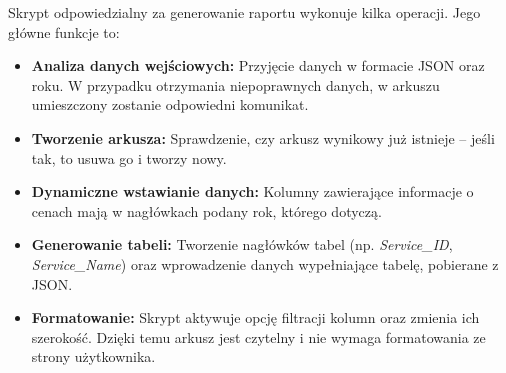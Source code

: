 Skrypt odpowiedzialny za generowanie raportu wykonuje kilka operacji. Jego główne funkcje to:
\begin{itemize}
    \item \textbf{Analiza danych wejściowych:} Przyjęcie danych w formacie JSON oraz roku. W przypadku otrzymania niepoprawnych danych, w arkuszu umieszczony zostanie odpowiedni komunikat.
    \item \textbf{Tworzenie arkusza:} Sprawdzenie, czy arkusz wynikowy już istnieje -- jeśli tak, to usuwa go i tworzy nowy.
    \item \textbf{Dynamiczne wstawianie danych:} Kolumny zawierające informacje o cenach mają w nagłówkach podany rok, którego dotyczą.
    \item \textbf{Generowanie tabeli:} Tworzenie nagłówków tabel (np. \emph{Service\_ID}, \emph{Service\_Name}) oraz wprowadzenie danych wypełniające tabelę, pobierane z JSON.
    \item \textbf{Formatowanie:} Skrypt aktywuje opcję filtracji kolumn oraz zmienia ich szerokość. Dzięki temu arkusz jest czytelny i nie wymaga formatowania ze strony użytkownika.
\end{itemize}





